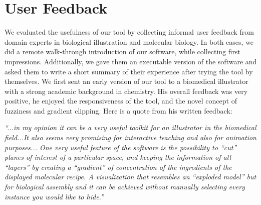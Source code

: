 \section{User Feedback}

We evaluated the usefulness of our tool by collecting informal user feedback from domain experts in biological illustration and molecular biology.
In both cases, we did a remote walk-through introduction of our software, while collecting first impressions.
Additionally, we gave them an executable version of the software and asked them to write a short summary of their experience after trying the tool by themselves.
We first sent an early version of our tool to a biomedical illustrator with a strong academic background in chemistry. 
His overall feedback was very positive, he enjoyed the responsiveness of the tool, and the novel concept of fuzziness and gradient clipping.
Here is a quote from his written feedback:


\textit{``...in my opinion it can be a very useful toolkit for an illustrator in the biomedical field...It also seems very promising for interactive teaching and also for animation purposes...
One very useful feature of the software is the possibility to ``cut'' planes of interest of a particular space, and keeping the information of all ``layers'' by creating a ``gradient'' of concentration of the ingredients of the displayed molecular recipe. 
A visualization that resembles an ``exploded model'' but for biological assembly and it can be achieved without manually selecting every instance you would like to hide.''}


